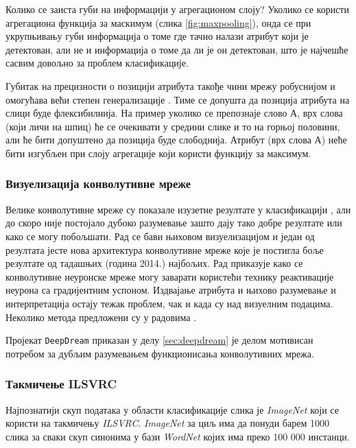 \documentclass[a4paper]{article}
\begin{document}
Колико се заиста губи на информацији у агрегационом слоју? Уколико се користи
агрегациона функција за маскимум (слика \ref{fig:maxpooling}), онда се при укрупњивању губи информација
о томе где тачно налази атрибут који је детектован, али не и информација о томе
да ли је он детектован, што је најчешће сасвим довољно за проблем класификације.

Губитак на прецизности о позицији атрибута такође чини мрежу робуснијом
и омогућава већи степен генерализације \cite{bishop}. Тиме се допушта да позиција
атрибута на слици буде флексибилнија. На пример уколико се препознаје слово
А, врх слова (који личи на шпиц) ће се очекивати у средини слике и то на
горњој половини, али ће бити допуштено да позиција буде слободнија. Атрибут
(врх слова А) неће бити изгубљен при слоју агрегације који користи функцију за максимум.

\subsubsection{Визуелизација конволутивне мреже}
Велике конволутивне мреже су показале изузетне резултате у класификацији \cite{krizhevsky},
али до скоро није постојало дубоко разумевање зашто дају тако добре резултате или како
се могу побољшати. Рад \cite{visualizeCovnet} се бави њиховом визуелизацијом и један
од резултата јесте нова архитектура конволутивне мреже које је постигла боље резултате
од тадашњих (година 2014.) најбољих. Рад \cite{visualizeCovnet1} приказује како се конволутивне
неуронске мреже могу заварати користећи технику реактивације неурона са градијентним успоном.
Издвајање атрибута и њихово разумевање и интерпретација остају тежак проблем, чак и када су над визуелним подацима.
Неколико метода предложени су у радовима \cite{visualizeCovnet2, visualizeCovnet4, visualizeCovnet3}.

Пројекат \texttt{DeepDream} приказан у делу \ref{sec:deepdream} је делом мотивисан
потребом за дубљим разумевањем функционисања конволутивних мрежа.

\subsubsection{Такмичење ILSVRC}
\label{subsubsec:ilsvrc}
Најпознатији скуп података у области класификације слика је \textit{ImageNet} који се
користи на такмичењу \textit{ILSVRC}. \textit{ImageNet} за циљ има да понуди барем 1000 слика
за сваки скуп синонима у бази \textit{WordNet} којих има преко 100 000 инстанци.
\end{document}
